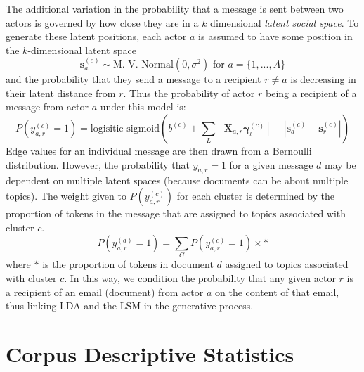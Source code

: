 \documentclass{pnastwo}
\begin{document}
\begin{article}
The additional variation in the probability that a message is sent between two actors is governed by how close they are in a $k$ dimensional \emph{latent social space}. To generate these latent positions, each actor $a$ is assumed to have some position in the $k$-dimensional latent space
\begin{equation}
	\mathbf{s}_a^{(c)} \sim \text{M. V. Normal}(0, \sigma^2) \text{ for } a = \{1, ...,A\}
\end{equation}
and the probability that they send a message to a recipient $r \neq a$ is decreasing in their latent distance from $r$. Thus the probability of actor $r$ being a recipient of a message from actor $a$ under this model is:
\begin{equation}
	P(y_{a,r}^{(c)} = 1) = \text{logisitic sigmoid}\left( b^{(c)} + \sum_L \left[\mathbf{X}_{a,r} \mathbf{\gamma}_l^{(c)}\right] - |\mathbf{s}_a^{(c)} - \mathbf{s}_r^{(c)}| \right)
\end{equation}
Edge values for an individual message are then drawn from a Bernoulli distribution. However, the probability that $y_{a,r} = 1$ for a given message $d$ may be dependent on multiple latent spaces (because documents can be about multiple topics). The weight given to $P(y_{a,r}^{(c)})$ for each cluster is determined by the proportion of tokens in the message that are assigned to topics associated with cluster $c$.  
\begin{equation}
	P(y_{a,r}^{(d)} = 1) = \sum_C P(y_{a,r}^{(c)} = 1) \times *
\end{equation}
where $*$ is the proportion of tokens in document $d$ assigned to topics associated with cluster $c$. In this way, we condition the probability that any given actor $r$ is a recipient of an email (document) from actor $a$ on the content of that email, thus linking LDA and the LSM in the generative process.
	
\section{Corpus Descriptive Statistics}


\end{article}
\end{document}
